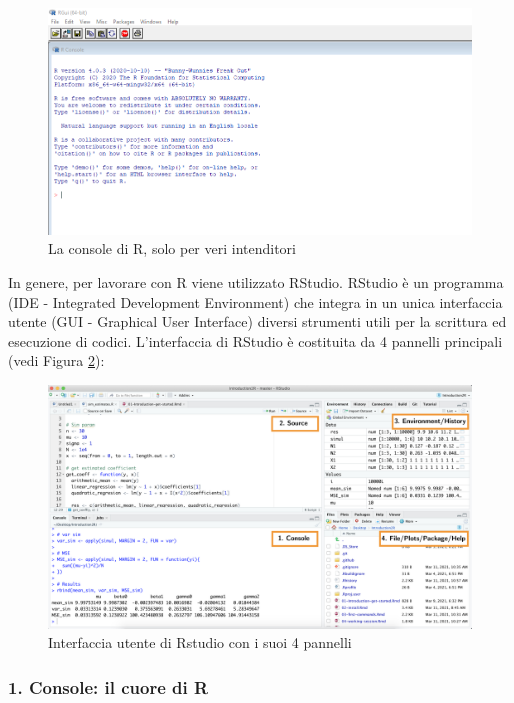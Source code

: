 \documentclass[
]{book}
\begin{document}
\begin{figure}

{\centering \includegraphics[width=0.85\linewidth]{images/r-console} 

}

\caption{La console di R, solo per veri intenditori}\label{fig:r-console}
\end{figure}

In genere, per lavorare con R viene utilizzato RStudio. RStudio è un programma (IDE - Integrated Development Environment) che integra in un unica interfaccia utente (GUI - Graphical User Interface) diversi strumenti utili per la scrittura ed esecuzione di codici. L'interfaccia di RStudio è costituita da 4 pannelli principali (vedi Figura \ref{fig:rstudio-gui}):

\begin{figure}

{\centering \includegraphics[width=0.85\linewidth]{images/rstudio-gui} 

}

\caption{Interfaccia utente di Rstudio con i suoi 4 pannelli}\label{fig:rstudio-gui}
\end{figure}

\hypertarget{console-il-cuore-di-r}{%
\subsubsection*{1. Console: il cuore di R}\label{console-il-cuore-di-r}}
\end{document}
